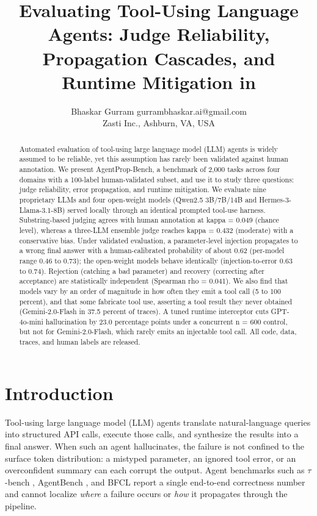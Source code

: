 \documentclass{article}
\title{Evaluating Tool-Using Language Agents: Judge Reliability,\\
Propagation Cascades, and Runtime Mitigation in \bench{}}
\author{\name Bhaskar Gurram \email gurrambhaskar.ai@gmail.com \\
\addr Zasti Inc., Ashburn, VA, USA}
\begin{document}
\maketitle

\begin{abstract}
Automated evaluation of tool-using large language model (LLM) agents is widely
assumed to be reliable, yet this assumption has rarely been validated against
human annotation. We present AgentProp-Bench, a benchmark of 2,000 tasks across
four domains with a 100-label human-validated subset, and use it to study three
questions: judge reliability, error propagation, and runtime mitigation. We
evaluate nine proprietary LLMs and four open-weight models (Qwen2.5 3B/7B/14B
and Hermes-3-Llama-3.1-8B) served locally through an identical prompted tool-use
harness.
Substring-based judging agrees with human annotation at kappa = 0.049
(chance level), whereas a three-LLM ensemble judge reaches kappa = 0.432
(moderate) with a conservative bias. Under validated evaluation, a
parameter-level injection propagates to a wrong final answer with a
human-calibrated probability of about 0.62 (per-model range 0.46 to 0.73); the
open-weight models behave identically (injection-to-error 0.63 to 0.74).
Rejection (catching a bad parameter) and recovery (correcting after acceptance)
are statistically independent (Spearman rho = 0.041). We also find that models
vary by an order of magnitude in how often they emit a tool call (5 to 100
percent), and that some fabricate tool use, asserting a tool result they never
obtained (Gemini-2.0-Flash in 37.5 percent of traces). A tuned runtime
interceptor cuts GPT-4o-mini hallucination by 23.0 percentage points under a
concurrent n = 600 control, but not for Gemini-2.0-Flash, which rarely emits an
injectable tool call. All code, data, traces, and human labels are released.
\end{abstract}

\section{Introduction}
\label{sec:intro}

Tool-using large language model (LLM) agents translate natural-language
queries into structured API calls, execute those calls, and synthesize
the results into a final answer.
When such an agent hallucinates, the failure is not confined to the
surface token distribution: a mistyped parameter, an ignored tool error,
or an overconfident summary can each corrupt the output.
Agent benchmarks such as $\tau$-bench \citep{yao2024tau},
AgentBench \citep{liu2024agentbench}, and BFCL \citep{yan2025bfcl}
report a single end-to-end correctness number and cannot localize
\emph{where} a failure occurs or \emph{how} it propagates through the
pipeline.
\end{document}
